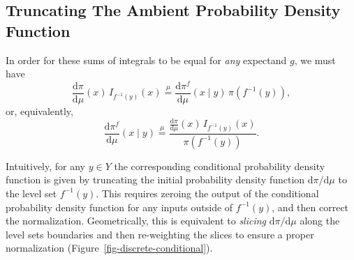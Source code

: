 \documentclass[
  letterpaper,
  DIV=11,
  numbers=noendperiod]{scrartcl}
\begin{document}
\subsection{Truncating The Ambient Probability Density
Function}\label{truncating-the-ambient-probability-density-function}

In order for these sums of integrals to be equal for \emph{any}
expectand \(g\), we must have \[
\frac{ \mathrm{d}  \pi }{ \mathrm{d}  \mu  }(x) \,
I_{f^{-1}(y)}(x)
\overset{ \mu }{ = }
\frac{ \mathrm{d}  \pi^{f} }{ \mathrm{d}  \mu  }( x \mid y ) \,
\pi ( f^{-1}(y) ),
\] or, equivalently, \[
\frac{ \mathrm{d}  \pi^{f} }{ \mathrm{d}  \mu  }( x \mid y )
\overset{ \mu }{ = }
\frac{
  \frac{ \mathrm{d}  \pi }{ \mathrm{d}  \mu  }(x) \, I_{f^{-1}(y)}(x)
}{
  \pi ( f^{-1}(y) )
  }.
\]

Intuitively, for any \(y \in Y\) the corresponding conditional
probability density function is given by truncating the initial
probability density function \(\mathrm{d} \pi / \mathrm{d} \mu\) to the
level set \(f^{-1}(y)\). This requires zeroing the output of the
conditional probability density function for any inputs outside of
\(f^{-1}(y)\), and then correct the normalization. Geometrically, this
is equivalent to \emph{slicing} \(\mathrm{d} \pi / \mathrm{d} \mu\)
along the level sets boundaries and then re-weighting the slices to
ensure a proper normalization (Figure~\ref{fig-discrete-conditional}).
\end{document}
